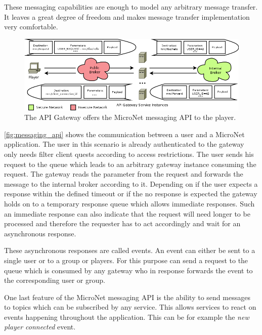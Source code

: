 These messaging capabilities are enough to model any arbitrary message transfer.
It leaves a great degree of freedom and makes message transfer implementation
very comfortable. 

\begin{figure}
	\centering
	\hspace*{-1.5cm}
	\includegraphics[width=1.2\textwidth]{images/architecture/MessagingAPI}
	\caption{The API Gateway offers the MicroNet messaging API to the player.}
	\label{fig:messaging_api}
\end{figure}

\autoref{fig:messaging_api} shows the communication between a user and a
MicroNet application. The user in this scenario is already authenticated to the
gateway only needs filter client quests according to access restrictions. The
user sends his request to the  queue which leads to an
arbitrary gateway instance consuming the request. The gateway reads the
 parameter from the request and forwards the message to the
internal broker according to it. Depending on if the user expects a response
within the defined timeout or if the no response is expected the gateway holds
on to a temporary response queue which allows immediate responses. Such an
immediate response can also indicate that the request will need longer to be
processed and therefore the requester has to act accordingly and wait for an
asynchronous response.

These asynchronous responses are called events. An event can either be sent to a
single user or to a group or players. For this purpose \mss{} can send a request
to the  queue which is consumed by any gateway who in
response forwards the event to the corresponding user or group.

One last feature of the MicroNet messaging API is the ability to send messages
to topics which can be subscribed by any service. This allows services to react
on events happening throughout the application. This can be for example the
\textit{new player connected} event.











